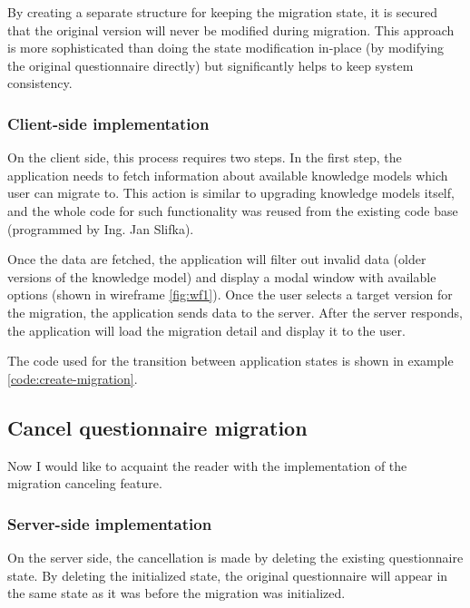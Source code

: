 By creating a separate structure for keeping the migration state, it is secured that the original version will never be modified during migration.
This approach is more sophisticated than doing the state modification in-place (by modifying the original questionnaire directly) but significantly helps to keep system consistency.

\subsubsection*{Client-side implementation}

On the client side, this process requires two steps.
In the first step, the application needs to fetch information about available knowledge models which user can migrate to.
This action is similar to upgrading knowledge models itself, and the whole code for such functionality was reused from the existing code base (programmed by Ing. Jan Slifka\cite{mt-slifka}).

Once the data are fetched, the application will filter out invalid data (older versions of the knowledge model) and display a modal window with available options (shown in wireframe \ref{fig:wf1}).
Once the user selects a target version for the migration, the application sends data to the server.
After the server responds, the application will load the migration detail and display it to the user.

The code used for the transition between application states is shown in example \ref{code:create-migration}.


\subsection{Cancel questionnaire migration}

Now I would like to acquaint the reader with the implementation of the migration canceling feature.

\subsubsection*{Server-side implementation}

On the server side, the cancellation is made by deleting the existing questionnaire state.
By deleting the initialized state, the original questionnaire will appear in the same state as it was before the migration was initialized.


